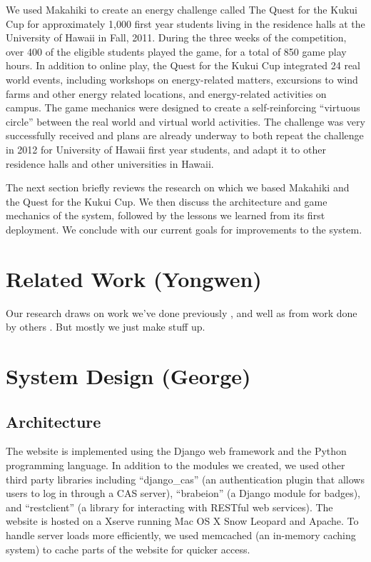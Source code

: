 \documentclass{acm_proc_article-sp}
\begin{document}
We used Makahiki to create an energy challenge called The Quest for the
Kukui Cup for approximately 1,000 first year students living in the
residence halls at the University of Hawaii in Fall, 2011.  During the
three weeks of the competition, over 400 of the eligible students played
the game, for a total of 850 game play hours.  In addition to online play,
the Quest for the Kukui Cup integrated 24 real world events, including
workshops on energy-related matters, excursions to wind farms and other
energy related locations, and energy-related activities on campus. The game
mechanics were designed to create a self-reinforcing ``virtuous circle''
between the real world and virtual world activities.  The challenge was
very successfully received and plans are already underway to both repeat
the challenge in 2012 for University of Hawaii first year students, and 
adapt it to other residence halls and other universities in Hawaii.

The next section briefly reviews the research on which we based Makahiki
and the Quest for the Kukui Cup.   We then discuss the architecture and
game mechanics of the system, followed by the lessons we learned from its
first deployment. We conclude with our current goals for improvements to
the system.

\section{Related Work (Yongwen)}
Our research draws on work we've done previously
\cite{csdl2-10-05,csdl2-10-07,csdl2-11-02,csdl2-11-03}, and well as from
work done by others \cite{Lazzaro2010}.  But mostly we just make stuff up.

\section{System Design (George)}

\subsection{Architecture}

The website is implemented using the Django web framework and the Python programming language. In addition to the modules we created, we used other third party libraries including ``django\_cas'' (an authentication plugin that allows users to log in through a CAS server), ``brabeion'' (a Django module for badges), and ``restclient'' (a library for interacting with RESTful web services). The website is hosted on a Xserve running Mac OS X Snow Leopard and Apache. To handle server loads more efficiently, we used memcached (an in-memory caching system) to cache parts of the website for quicker access.
\end{document}
